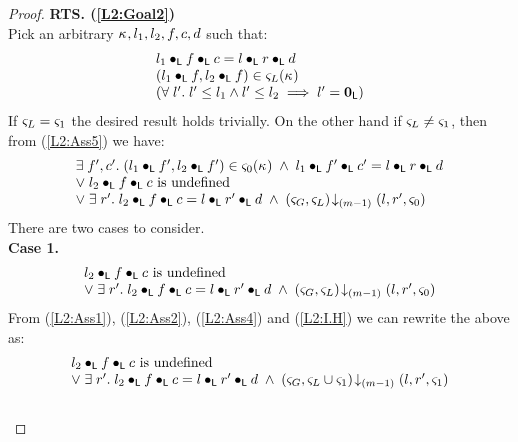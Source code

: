 \begin{lemma}[]
\begin{proof}
%
%
%
%
%
\noindent\textbf{RTS. (\ref{L2:Goal2})}\\
Pick an arbitrary $\kappa_{}, l_1, l_2, f, c, d$ such that:
%
\begin{align}
	\begin{array}{l}
		l_1 \bullet_{\textsf{L}} f \bullet_{\textsf{L}} c=  l \bullet_{\textsf{L}} r \bullet_{\textsf{L}} d\\
  	(l_1 \bullet_{\textsf{L}} f, l_2 \bullet_{\textsf{L}} f) \in \varsigma_{L}(\kappa_{}) \\
  	\left(\forall\; l'.\; l' \leq l_1 \land l' \leq l_2 \implies l' = \mathbf{0}_{\textsf{L}}\right)\\
	\end{array} \label{LIH: Ass1}
\end{align} 
%
If $\varsigma_{L} = \varsigma_{1}$ the desired result holds trivially. On the other hand if $\varsigma_{L} \not= \varsigma_{1}$, then from (\ref{L2:Ass5}) we have:
\begin{align}
	\begin{array}{l}
		\exists\; f', c'.\; (l_1 \bullet_{\textsf{L}} f', l_2 \bullet_{\textsf{L}} f') \in \varsigma_{0}(\kappa_{}) \;\land\; l_1 \bullet_{\textsf{L}} f' \bullet_{\textsf{L}} c' =  l \bullet_{\textsf{L}} r \bullet_{\textsf{L}} d\\
		\lor\;l_2 \bullet_{\textsf{L}} f \bullet_{\textsf{L}} c \text{ is undefined}\\
		\lor\; \exists\; r'.\; l_2 \bullet_{\textsf{L}} f \bullet_{\textsf{L}} c = l \bullet_{\textsf{L}} r' \bullet_{\textsf{L}} d \;\land\; \left(\varsigma_{G}, \varsigma_{L}\right) \!\downarrow_{(m-1)} \left(l, r', \varsigma_{0}\right)
	\end{array} \nonumber
\end{align}
%
There are two cases to consider.\\

\noindent\textbf{Case 1.} 
%
\[
\begin{array}{l}
	l_2 \bullet_{\textsf{L}} f \bullet_{\textsf{L}} c \text{ is undefined}\\
	\lor\; \exists\; r'.\; l_2 \bullet_{\textsf{L}} f \bullet_{\textsf{L}} c = l \bullet_{\textsf{L}} r' \bullet_{\textsf{L}} d \;\land\;  \left(\varsigma_{G}, \varsigma_{L}\right) \!\downarrow_{(m-1)} \left(l, r', \varsigma_{0}\right)
\end{array}
\]
%
From (\ref{L2:Ass1}), (\ref{L2:Ass2}), (\ref{L2:Ass4}) and (\ref{L2:I.H}) we can rewrite the above as:
%
\begin{align}
\begin{array}{l}
	l_2 \bullet_{\textsf{L}} f \bullet_{\textsf{L}} c \text{ is undefined}\\
	\lor\; \exists\; r'.\; l_2 \bullet_{\textsf{L}} f \bullet_{\textsf{L}} c = l \bullet_{\textsf{L}} r' \bullet_{\textsf{L}} d \;\land\; \left(\varsigma_{G}, \varsigma_{L} \cup \varsigma_{1}\right) \!\downarrow_{(m-1)} \left(l, r', \varsigma_{1}\right)
\end{array}\label{L2:Case1}
\end{align}\\


\end{proof}
\end{lemma}
